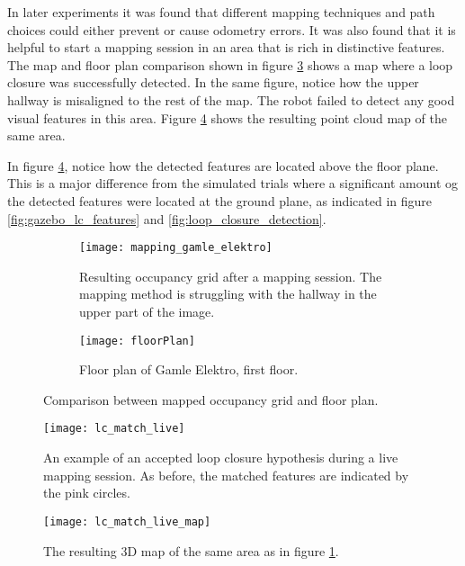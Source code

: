 In later experiments it was found that different mapping techniques and path choices could either prevent or cause odometry errors. It was also found that it is helpful to start a mapping session in an area that is rich in distinctive features. The map and floor plan comparison shown in figure \ref{fig:comparison} shows a map where a loop closure was successfully detected. In the same figure, notice how the upper hallway is misaligned to the rest of the map. The robot failed to detect any good visual features in this area. Figure \ref{fig:lc_match_live} shows the resulting point cloud map of the same area.

In figure \ref{fig:lc_match_live}, notice how the detected features are located above the floor plane. This is a major difference from the simulated trials where a significant amount og the detected features were located at the ground plane, as indicated in figure \ref{fig:gazebo_lc_features} and \ref{fig:loop_closure_detection}.

\begin{figure}
	\centering
	\begin{subfigure}[b]{1\textwidth}
		\texttt{[image: mapping\_gamle\_elektro]}
		\caption{Resulting occupancy grid after a mapping session. The mapping  method is struggling with the  hallway in the upper part of the image.}
		\label{fig:mapping_gamle_elektro}
	\end{subfigure}
	\begin{subfigure}[b]{1\textwidth}
		\texttt{[image: floorPlan]}
		\caption{Floor plan of Gamle Elektro, first floor.}
		\label{fig:floorPlan}
	\end{subfigure}
	\caption{Comparison between mapped occupancy grid and floor plan.}\label{fig:comparison}
\end{figure}



\begin{figure}[h]
	\centering
	\texttt{[image: lc\_match\_live]}
	\caption{An example of an accepted loop closure hypothesis during a live mapping session. As before, the matched features are indicated by the pink circles.}
	\label{fig:lc_match_live}
\end{figure}

\begin{figure}[p]
	\centering
	\texttt{[image: lc\_match\_live\_map]}
	\caption{The resulting 3D map of the same area as in figure \ref{fig:mapping_gamle_elektro}.}
	\label{fig:lc_match_live_map}
\end{figure}

